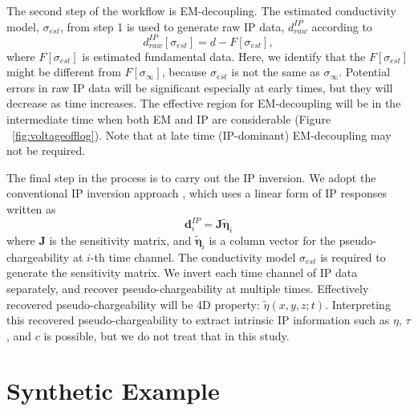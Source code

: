 \documentclass[paper]{geophysics}
\newcommand{\siginf}{\sigma_\infty}
\newcommand{\peta}{\tilde{\eta}}
\newcommand{\dip}{d^{IP}}
\newcommand{\sigest}{\sigma_{est}}
\begin{document}
The second step of the workflow is EM-decoupling. The estimated conductivity model, $\sigest$, from step 1 is used to generate raw IP data, $\dip_{raw}$ according to
\begin{equation}
  \dip_{raw}[\sigest] = d - F[\sigest],
  \label{eq:rawIPdata}
\end{equation}
where $F[\sigest]$ is estimated fundamental data. Here, we identify that the $F[\sigest]$ might be different from $F[\siginf]$, because $\sigest$ is not the same as $\siginf$. Potential errors in raw IP data will be significant especially at early times, but they will decrease as time increases. The effective region for EM-decoupling will be in the intermediate time when both EM and IP are considerable (Figure ~\ref{fig:voltageofflog}). Note that at late time (IP-dominant) EM-decoupling may not be required.

The final step in the process is to carry out the IP inversion. We adopt the conventional IP inversion approach \cite[]{doug1994}, which uses a linear form of IP responses written as
\begin{equation}
  \mathbf{d}^{IP}_i = \mathbf{J} \boldsymbol{\peta}_i
  \label{eq:linearIP}
\end{equation}
where $\mathbf{J}$ is the sensitivity matrix, and $\boldsymbol{\peta}_i$ is a column vector for the pseudo-chargeability at $i$-th time channel. The conductivity model $\sigest$ is required to generate the sensitivity matrix. We invert each time channel of IP data separately, and recover pseudo-chargeability at multiple times. Effectively recovered pseudo-chargeability will be 4D property: $\peta(x, y, z; t)$. Interpreting this recovered pseudo-chargeability to extract intrinsic IP information such as $\eta$, $\tau$, and $c$ is possible, but we do not treat that in this study.


\section{Synthetic Example}
\end{document}
